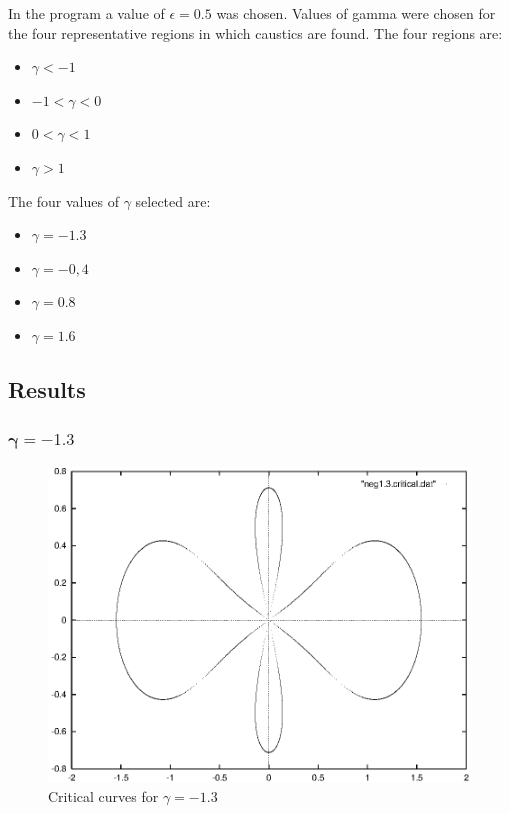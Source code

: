 \documentclass[a4paper]{IEEEtran}
\begin{document}
    In the program a value of $\epsilon = 0.5$ was chosen. Values
    of gamma were chosen for the four representative regions in which
    caustics are found. The four regions are:
    \begin{itemize}
        \item $\gamma < -1$
        \item $-1 < \gamma < 0$
        \item $0 < \gamma < 1$
        \item $\gamma > 1$
    \end{itemize}
    The four values of $\gamma$ selected are:
    \begin{itemize}
        \item $\gamma = -1.3$ 
        \item $\gamma = -0,4$
        \item $\gamma = 0.8$
        \item $\gamma = 1.6$
    \end{itemize}

    \subsection{Results}

    \subsubsection{$\mathbf{\gamma = -1.3}$}
    \begin{figure}
        \caption{Critical curves for $\gamma = -1.3$}
        \label{fig:gamma-1-3} 
        \begin{center}
            \includegraphics[width=\columnwidth]{images/neg1-3-critical.eps} 
        \end{center}
    \end{figure}
\end{document}

